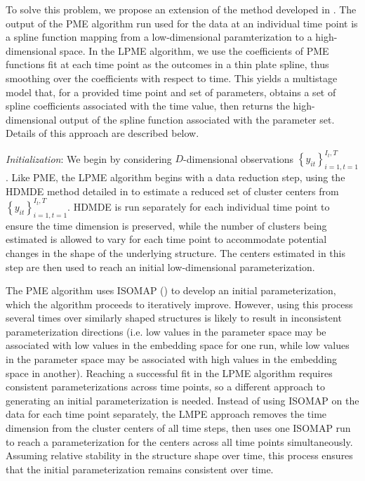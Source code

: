 \documentclass[11pt,reqno]{article}
\theoremstyle{definition}
\begin{document}
To solve this problem, we propose an extension of the method developed in \cite{mengPrincipalManifoldEstimation2021}. The output of the PME algorithm run used for the data at an individual time point is a spline function mapping from a low-dimensional paramterization to a high-dimensional space. In the LPME algorithm, we use the coefficients of PME functions fit at each time point as the outcomes in a thin plate spline, thus smoothing over the coefficients with respect to time. This yields a multistage model that, for a provided time point and set of parameters, obtains a set of spline coefficients associated with the time value, then returns the high-dimensional output of the spline function associated with the parameter set. Details of this approach are described below.

\textit{Initialization}: We begin by considering $D$-dimensional observations $\left\{y_{it}\right\}_{i=1, t=1}^{I_t, T}$. Like PME, the LPME algorithm begins with a data reduction step, using the HDMDE method detailed in \cite{mengPrincipalManifoldEstimation2021} to estimate a reduced set of cluster centers from $\left\{y_{it}\right\}_{i=1, t=1}^{I_t, T}$. HDMDE is run separately for each individual time point to ensure the time dimension is preserved, while the number of clusters being estimated is allowed to vary for each time point to accommodate potential changes in the shape of the underlying structure. The centers estimated in this step are then used to reach an initial low-dimensional parameterization.

The PME algorithm uses ISOMAP (\cite{tenenbaumGlobalGeometricFramework2000}) to develop an initial parameterization, which the algorithm proceeds to iteratively improve. However, using this process several times over similarly shaped structures is likely to result in inconsistent parameterization directions (i.e. low values in the parameter space may be associated with low values in the embedding space for one run, while low values in the parameter space may be associated with high values in the embedding space in another). Reaching a successful fit in the LPME algorithm requires consistent parameterizations across time points, so a different approach to generating an initial parameterization is needed. Instead of using ISOMAP on the data for each time point separately, the LMPE approach removes the time dimension from the cluster centers of all time steps, then uses one ISOMAP run to reach a parameterization for the centers across all time points simultaneously. Assuming relative stability in the structure shape over time, this process ensures that the initial parameterization remains consistent over time.
\end{document}
